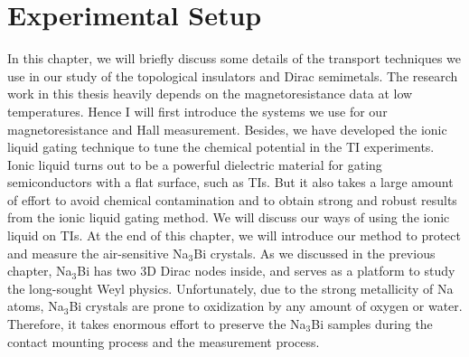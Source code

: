 
\chapter{Experimental Setup\label{ch:expsetup}}

In this chapter, we will briefly discuss some details of the transport techniques we use in our study of the topological insulators and Dirac semimetals. The research work in this thesis heavily depends on the magnetoresistance data at low temperatures. Hence I will first introduce the systems we use for our magnetoresistance and Hall measurement. Besides, we have developed the ionic liquid gating technique to tune the chemical potential in the TI experiments. Ionic liquid turns out to be a powerful dielectric material for gating semiconductors with a flat surface, such as TIs. But it also takes a large amount of effort to avoid chemical contamination and to obtain strong and robust results from the ionic liquid gating method. We will discuss our ways of using the ionic liquid on TIs. At the end of this chapter, we will introduce our method to protect and measure the air-sensitive Na$_3$Bi crystals. As we discussed in the previous chapter, Na$_3$Bi has two 3D Dirac nodes inside, and serves as a platform to study the long-sought Weyl physics. Unfortunately, due to the strong metallicity of Na atoms, Na$_3$Bi crystals are prone to oxidization by any amount of oxygen or water. Therefore, it takes enormous effort to preserve the Na$_3$Bi samples during the contact mounting process and the measurement process.




